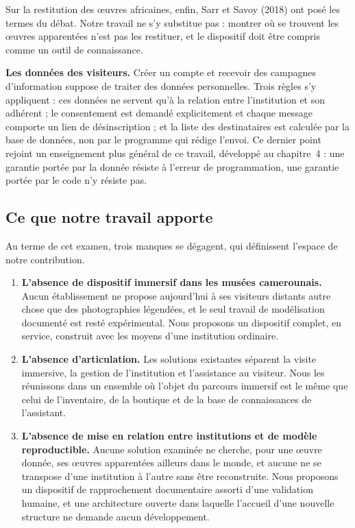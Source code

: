 Sur la restitution des œuvres africaines, enfin, Sarr et Savoy (2018) ont posé
les termes du débat. Notre travail ne s'y substitue pas : montrer où se trouvent
les œuvres apparentées n'est pas les restituer, et le dispositif doit être
compris comme un outil de connaissance.

\textbf{Les données des visiteurs.} Créer un compte et recevoir des campagnes
d'information suppose de traiter des données personnelles. Trois règles s'y
appliquent : ces données ne servent qu'à la relation entre l'institution et son
adhérent ; le consentement est demandé explicitement et chaque message comporte
un lien de désinscription ; et la liste des destinataires est calculée par la
base de données, non par le programme qui rédige l'envoi. Ce dernier point
rejoint un enseignement plus général de ce travail, développé au chapitre~4 :
une garantie portée par la donnée résiste à l'erreur de programmation, une
garantie portée par le code n'y résiste pas.





\subsection{Ce que notre travail apporte}

Au terme de cet examen, trois manques se dégagent, qui définissent l'espace de
notre contribution.

\begin{enumerate}
  \item \textbf{L'absence de dispositif immersif dans les musées camerounais.}
        Aucun établissement ne propose aujourd'hui à ses visiteurs distants
        autre chose que des photographies légendées, et le seul travail de
        modélisation documenté est resté expérimental. Nous proposons un
        dispositif complet, en service, construit avec les moyens d'une
        institution ordinaire.

  \item \textbf{L'absence d'articulation.} Les solutions existantes séparent la
        visite immersive, la gestion de l'institution et l'assistance au
        visiteur. Nous les réunissons dans un ensemble où l'objet du parcours
        immersif est le même que celui de l'inventaire, de la boutique et de la
        base de connaissances de l'assistant.

  \item \textbf{L'absence de mise en relation entre institutions et de modèle
        reproductible.} Aucune solution examinée ne cherche, pour une œuvre
        donnée, ses œuvres apparentées ailleurs dans le monde, et aucune ne se
        transpose d'une institution à l'autre sans être reconstruite. Nous
        proposons un dispositif de rapprochement documentaire assorti d'une
        validation humaine, et une architecture ouverte dans laquelle l'accueil
        d'une nouvelle structure ne demande aucun développement.
\end{enumerate}


